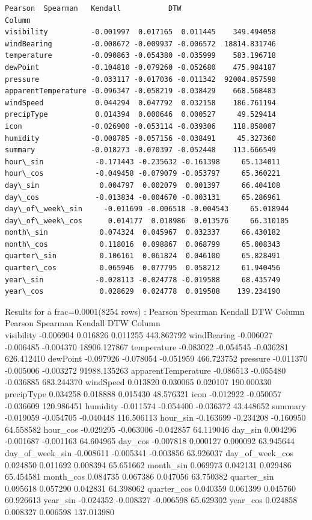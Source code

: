\documentclass[11pt]{article}
\begin{document}
    \begin{Verbatim}[commandchars=\\\{\}]
                      Pearson  Spearman   Kendall           DTW
Column
visibility          -0.001997  0.017165  0.011445    349.494058
windBearing         -0.008672 -0.009937 -0.006572  18814.831746
temperature         -0.090863 -0.054380 -0.035999    583.196718
dewPoint            -0.104810 -0.079260 -0.052680    475.984187
pressure            -0.033117 -0.017036 -0.011342  92004.857598
apparentTemperature -0.096347 -0.058219 -0.038429    668.568483
windSpeed            0.044294  0.047792  0.032158    186.761194
precipType           0.014394  0.000646  0.000527     49.529414
icon                -0.026900 -0.053114 -0.039306    118.858007
humidity            -0.008785 -0.057156 -0.038491     45.327360
summary             -0.018273 -0.070397 -0.052448    113.666549
hour\_sin            -0.171443 -0.235632 -0.161398     65.134011
hour\_cos            -0.049458 -0.079079 -0.053797     65.360221
day\_sin              0.004797  0.002079  0.001397     66.404108
day\_cos             -0.013834 -0.004670 -0.003131     65.286961
day\_of\_week\_sin     -0.011699 -0.006518 -0.004543     65.018944
day\_of\_week\_cos      0.014177  0.018986  0.013576     66.310105
month\_sin            0.074324  0.045967  0.032337     66.430182
month\_cos            0.118016  0.098867  0.068799     65.008343
quarter\_sin          0.106161  0.061824  0.046100     65.828491
quarter\_cos          0.065946  0.077795  0.058212     61.940456
year\_sin            -0.028113 -0.024778 -0.019588     68.435749
year\_cos             0.028629  0.024778  0.019588    139.234190
    \end{Verbatim}

    Results for a frac=0.0001(8254 rows) : Pearson Spearman Kendall DTW
Column Pearson Spearman Kendall DTW Column\\
visibility -0.006904 0.016826 0.011255 443.862792 windBearing -0.006027
-0.006485 -0.004370 18906.127867 temperature -0.083022 -0.054545
-0.036281 626.412410 dewPoint -0.097926 -0.078054 -0.051959 466.723752
pressure -0.011370 -0.005006 -0.003272 91988.135263 apparentTemperature
-0.086513 -0.055480 -0.036885 683.244370 windSpeed 0.013820 0.030065
0.020107 190.000330 precipType 0.034258 0.018888 0.015430 48.576321 icon
-0.012922 -0.050057 -0.036609 120.986451 humidity -0.011574 -0.054400
-0.036372 43.448652 summary -0.019059 -0.054705 -0.040448 116.506113
hour\_sin -0.163699 -0.234208 -0.160950 64.558582 hour\_cos -0.029295
-0.063006 -0.042857 64.119046 day\_sin 0.004296 -0.001687 -0.001163
64.604965 day\_cos -0.007818 0.000127 0.000092 63.945644
day\_of\_week\_sin -0.008611 -0.005341 -0.003856 63.926037
day\_of\_week\_cos 0.024850 0.011692 0.008394 65.651662 month\_sin
0.069973 0.042131 0.029486 65.454581 month\_cos 0.084735 0.067386
0.047056 63.750382 quarter\_sin 0.095618 0.057290 0.042831 64.398062
quarter\_cos 0.040359 0.061399 0.045760 60.926613 year\_sin -0.024352
-0.008327 -0.006598 65.629302 year\_cos 0.024858 0.008327 0.006598
137.013980
\end{document}

